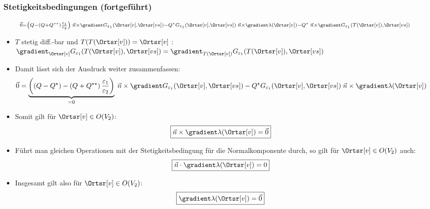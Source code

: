       \begin{frame}
     \frametitle{Stetigkeitsbedingungen (fortgeführt)}
        \begin{equation*}
          {\scriptstyle \vec{0} = \left( Q  - \left( Q +  Q^{\star\star}\right) \frac{\varepsilon_1}{\varepsilon_2} \right)\; \vec{n}\times \gradient G_{\varepsilon_1}(\Ortsr[v], \Ortsr[vs])  
          - Q^\star G_{\varepsilon_1}(\Ortsr[v], \Ortsr[vs])\; \vec{n}\times\gradient \lambda(\Ortsr[v]) - Q^\star \; \vec{n}\times\gradient G_{\varepsilon_1}(T(\Ortsr[v]), \Ortsr[vs])}
        \end{equation*}
      \begin{itemize}[<+->]
      \item $T$ stetig diff.-bar und $T(T(\Ortsr[v]))=\Ortsr[v]$ : $\gradient_{\Ortsr[v]} G_{\varepsilon_1}(T(\Ortsr[v]), \Ortsr[vs])  = \gradient_{T(\Ortsr[v])} G_{\varepsilon_1}(T(\Ortsr[v]), \Ortsr[vs])$
        \item Damit lässt sich der Ausdruck weiter zusammenfassen:
        \begin{align*}
          \vec{0} &= \underbrace{\left( \left(Q - Q^\star\right) - \left( Q +  Q^{\star\star}\right) \frac{\varepsilon_1}{\varepsilon_2} \right)}_{=0}\; \vec{n}\times \gradient G_{\varepsilon_1}(\Ortsr[v], \Ortsr[vs])   - Q^\star G_{\varepsilon_1}(\Ortsr[v], \Ortsr[vs])\; \vec{n}\times\gradient \lambda(\Ortsr[v]) 
        \end{align*}
      \item Somit gilt für $\Ortsr[v]\in O(V_2)$:
        \begin{equation*}
          \boxed{\vec{n}\times\gradient \lambda(\Ortsr[v]) = \vec{0}}
          \end{equation*}

     \item Führt man gleichen Operationen mit der Stetigkeitsbedingung für die Normalkomponente durch, so gilt für $\Ortsr[v]\in O(V_2)$ auch:
        \begin{equation*}
          \boxed{\vec{n}\cdot\gradient \lambda(\Ortsr[v]) = 0}
          \end{equation*}
 \item Insgesamt gilt also für $\Ortsr[v]\in O(V_2)$:
        \begin{equation*}
          \boxed{\gradient \lambda(\Ortsr[v]) = \vec{0}}
          \end{equation*}
        \end{itemize}
      \end{frame}

